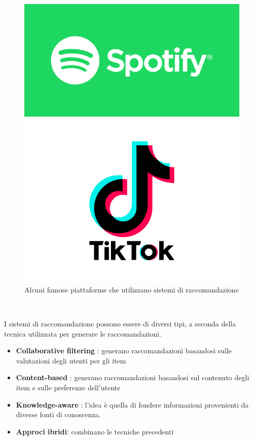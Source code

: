\begin{figure}[h!]
\begin{minipage}{0.2\textwidth}
        \centering
        \includegraphics[width=\textwidth]{images/spotify.png}
    \end{minipage}\hfill
    \begin{minipage}{0.2\textwidth}
        \centering
        \includegraphics[width=\textwidth]{images/tiktok.png}
    \end{minipage}
    \caption{Alcuni famose piattaforme che utilizzano sistemi di raccomandazione}
\end{figure}\


\noindent I sistemi di raccomandazione possono essere di diversi tipi, a seconda della tecnica utilizzata per generare le raccomandazioni.
\begin{itemize}
    \item \textbf{Collaborative filtering} \cite{CFRS}: generano raccomandazioni basandosi sulle valutazioni degli utenti per gli item
    \item \textbf{Content-based} \cite{Lops2011}: generano raccomandazioni basandosi sul contenuto degli item e sulle preferenze dell'utente
    \item \textbf{Knowledge-aware} \cite{KnowledgeAware}: l'idea è quella di fondere informazioni provenienti da diverse fonti di conoscenza.
    \item \textbf{Approci ibridi}: combinano le tecniche precedenti
\end{itemize}



